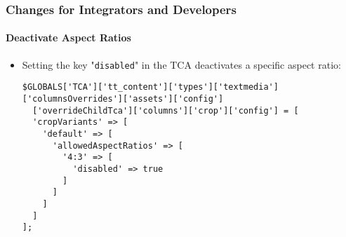 %

\begin{frame}[fragile]
	\frametitle{Changes for Integrators and Developers}
	\framesubtitle{Deactivate Aspect Ratios}


	\begin{itemize}
		\item Setting the key "\texttt{disabled}" in the TCA deactivates
			a specific aspect ratio:
\begin{lstlisting}
$GLOBALS['TCA']['tt_content']['types']['textmedia']['columnsOverrides']['assets']['config']
  ['overrideChildTca']['columns']['crop']['config'] = [
  'cropVariants' => [
    'default' => [
      'allowedAspectRatios' => [
        '4:3' => [
          'disabled' => true
        ]
      ]
    ]
  ]
];
\end{lstlisting}

	\end{itemize}

\end{frame}

